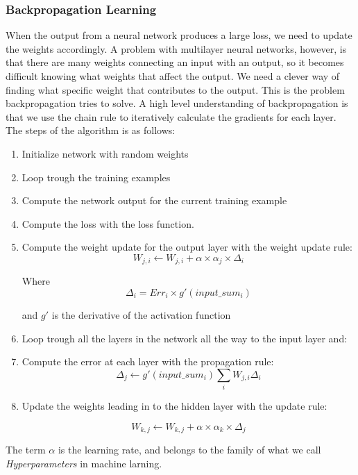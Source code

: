 \subsubsection*{Backpropagation Learning}
When the output from a neural network produces a large loss, we need to update the weights accordingly. A problem with multilayer neural networks, however, is that there are many weights connecting an input with an output, so it becomes difficult knowing what weights that affect the output. We need a clever way of finding what specific weight that contributes to the output. This is the problem backpropagation tries to solve. A high level understanding of backpropagation is that we use the chain rule to iteratively calculate the gradients for each layer. The steps of the algorithm is as follows:

\begin{enumerate}
	\item Initialize network with random weights
	\item Loop trough the training examples
	\item Compute the network output for the current training example
	\item Compute the loss with the loss function.
	\item Compute the weight update for the output layer with the weight update rule:
	$$
		W_{j,i} \leftarrow W_{j,i} + \alpha \times \alpha_j \times \Delta_i
	$$
	
	Where 
	$$
		\Delta_i = Err_i \times g'(input\_sum_i)
	$$
	
	and $g'$ is the derivative of the activation function
	
	\item Loop trough all the layers in the network all the way to the input layer and:
	\item Compute the error at each layer with the propagation rule:
	$$ 
		\Delta_j \leftarrow g'(input\_sum_i)\sum_{i}W_{j,i}\Delta_i
	$$
	
	\item Update the weights leading in to the hidden layer with the update rule:
	
	$$ 
		W_{k,j} \leftarrow W_{k,j} + \alpha \times \alpha_k \times \Delta_j
	$$
	
\end{enumerate}

The term $\alpha$ is the learning rate, and belongs to the family of what we call \emph{Hyperparameters} in machine larning.

